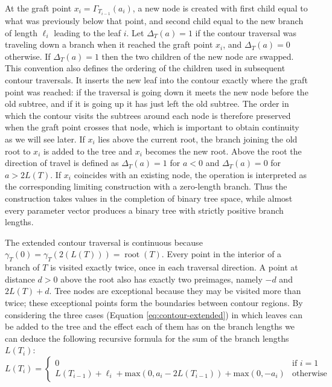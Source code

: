 \documentclass{article}
\begin{document}
At the graft point $x_i=\Gamma_{T_{i-1}}(a_i)$, 
a new node is created with first child equal to what was previously below that point,
and second child equal to the new branch of length $\ell_i$ leading to the leaf $i$.
Let $\Delta_T(a)=1$ if the contour traversal was traveling down a branch 
when it reached the graft point $x_i$, and $\Delta_T(a)=0$ otherwise.
If $\Delta_T(a)=1$ then the two children of the new node are swapped.
This convention also defines the ordering of the children used in subsequent
contour traversals. It inserts the new leaf into the contour exactly where
the graft point was reached: if the traversal is going down it meets the new
node before the old subtree, and if it is going up it has just left the old
subtree. The order in which the contour visits the subtrees around each node
is therefore preserved when the graft point crosses that node, which is
important to obtain continuity as we will see later.
If $x_i$ lies above the current root,
the branch joining the old root to $x_i$ is added to the tree and $x_i$
becomes the new root. Above the root the direction of travel is defined
as $\Delta_T(a)=1$ for $a<0$ and $\Delta_T(a)=0$ for $a>2L(T)$.
If $x_i$ coincides with an existing node, the
operation is interpreted as the corresponding limiting construction with
a zero-length branch. Thus the construction takes values in the completion
of binary tree space, while almost every parameter vector produces a binary
tree with strictly positive branch lengths.

The extended contour traversal is continuous because $\gamma_T(0)=\gamma_T(2(L(T)))=\operatorname{root}(T)$. Every point in the interior of a branch of $T$ is visited exactly twice, once in each
traversal direction. A point at distance $d>0$ above the root also has exactly two preimages,
namely $-d$ and $2L(T)+d$.
Tree nodes are exceptional because they may be visited more than twice;
these exceptional points form the boundaries between contour regions.
By considering the three cases (Equation \ref{eq:contour-extended}) in which leaves can be added to the tree and the effect each of them has on the branch lengths we can deduce the following recursive formula for the sum of the branch lengths $L(T_i)$:
\begin{equation}
L(T_i)=\begin{cases}
0 & \text{if $i=1$}\\
L(T_{i-1})+\ell_i+\mathrm{max}(0,a_i-2L(T_{i-1}))+\mathrm{max}(0,-a_i) & \text{otherwise}
\end{cases}
\end{equation}
\end{document}
